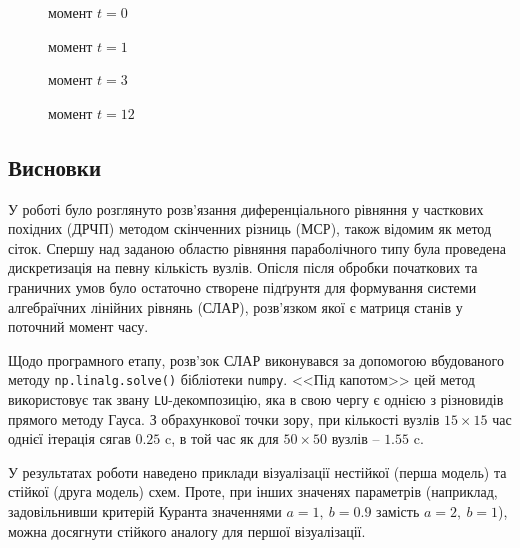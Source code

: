 \documentclass[a4paper,14pt]{extarticle} %
\begin{document}
\begin{figure}[H]
    \begin{minipage}[H]{0.49\linewidth}
         момент $t=0$
    \end{minipage}
    \hfill
    \begin{minipage}[H]{0.49\linewidth}
         момент $t=1$
    \end{minipage}
\end{figure}

\begin{figure}[H]
    \begin{minipage}[H]{0.49\linewidth}
         момент $t=3$
    \end{minipage}
    \hfill
    \begin{minipage}[H]{0.49\linewidth}
         момент $t=12$
    \end{minipage}
\end{figure}

\subsection*{Висновки}

У роботі було розглянуто розв'язання диференціального рівняння у часткових похідних (ДРЧП) методом скінченних 
різниць (МСР), також відомим як метод сіток. Спершу над заданою областю рівняння параболічного типу була проведена 
дискретизація на певну кількість вузлів. Опісля після обробки початкових та граничних умов було остаточно 
створене підґрунтя для формування системи алгебраїчних лінійних рівнянь (СЛАР), розв'язком якої є матриця 
станів у поточний момент часу.

Щодо програмного етапу, розв'зок СЛАР виконувався за допомогою вбудованого методу \texttt{np.linalg.solve()} 
бібліотеки \texttt{numpy}. <<Під капотом>> цей метод використовує так звану \texttt{LU}-декомпозицію, 
яка в свою чергу є однією з різновидів прямого методу Гауса. З обрахункової точки зору, при кількості вузлів 
$15\times 15$ час однієї ітерація сягав $0.25\text{ c}$, в той час як для $50\times 50$ вузлів -- $1.55\text{ c}$.

У результатах роботи наведено приклади візуалізації нестійкої (перша модель) та стійкої (друга модель) схем. 
Проте, при інших значенях параметрів (наприклад, задовільнивши критерій Куранта значеннями $a=1,\ b=0.9$ замість 
$a=2,\ b=1$), можна досягнути стійкого аналогу для першої візуалізації. 
\end{document}
